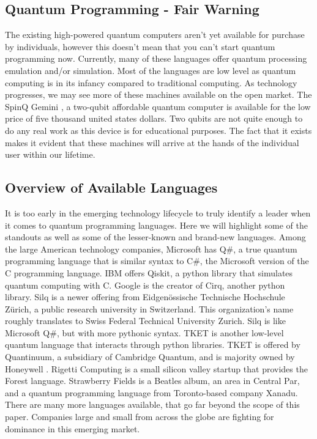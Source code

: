 \documentclass[conference]{IEEEtran}
\begin{document}
\subsection{Quantum Programming - Fair Warning}
The existing high-powered quantum computers aren't yet available for purchase by individuals, however this doesn't mean that you can't start quantum programming now. 
Currently, many of these languages offer quantum processing emulation and/or simulation. 
Most of the languages are low level as quantum computing is in its infancy compared to traditional computing. 
As technology progresses, we may see more of these machines available on the open market. 
The SpinQ Gemini \cite{b3}, a two-qubit affordable quantum computer is available for the low price of five thousand united states dollars. 
Two qubits are not quite enough to do any real work as this device is for educational purposes. 
The fact that it exists makes it evident that these machines will arrive at the hands of the individual user within our lifetime.

\subsection{Overview of Available Languages}
It is too early in the emerging technology lifecycle to truly identify a leader when it comes to quantum programming languages. 
Here we will highlight some of the standouts as well as some of the lesser-known and brand-new languages. 
Among the large American technology companies, Microsoft has Q\#, a true quantum programming language that is similar syntax to C\#, the Microsoft version of the C programming language. 
IBM offers Qiskit, a python library that simulates quantum computing with C. 
Google is the creator of Cirq, another python library. 
Silq is a newer offering from Eidgenössische Technische Hochschule Zürich, a public research university in Switzerland. 
This organization's name roughly translates to Swiss Federal Technical University Zurich. 
Silq is like Microsoft Q\#, but with more pythonic syntax. 
TKET is another low-level quantum language that interacts through python libraries. 
TKET is offered by Quantinuum, a subsidiary of Cambridge Quantum, and is majority owned by Honeywell \cite{b4}. 
Rigetti Computing is a small silicon valley startup that provides the Forest language. 
Strawberry Fields is a Beatles album, an area in Central Par, and a quantum programming language from Toronto-based company Xanadu. 
There are many more languages available, that go far beyond the scope of this paper. 
Companies large and small from across the globe are fighting for dominance in this emerging market.
\end{document}
